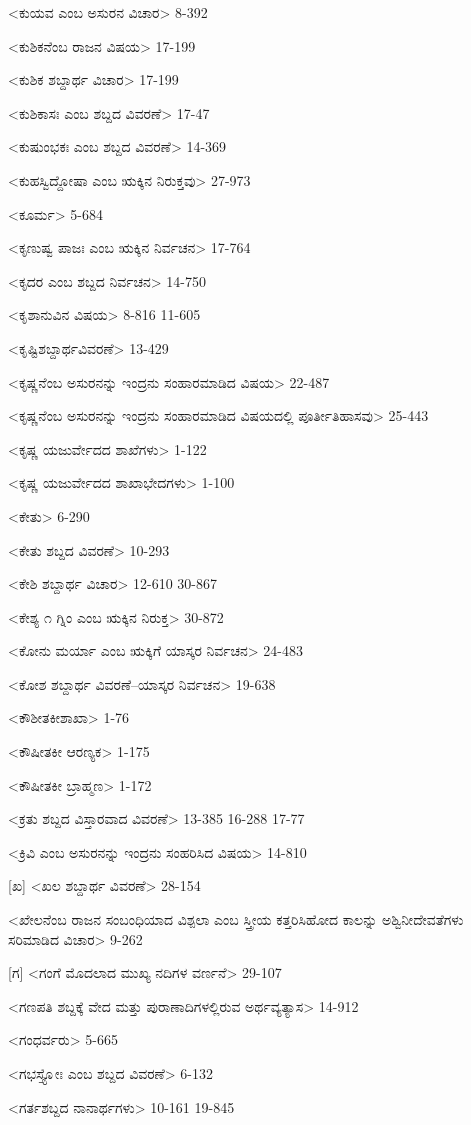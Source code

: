 <ಕುಯವ ಎಂಬ ಅಸುರನ ವಿಚಾರ>
8-392

<ಕುಶಿಕನೆಂಬ ರಾಜನ ವಿಷಯ>
17-199

<ಕುಶಿಕ ಶಬ್ದಾರ್ಥ ವಿಚಾರ>
17-199

<ಕುಶಿಕಾಸಃ ಎಂಬ ಶಬ್ದದ ವಿವರಣೆ>
17-47

<ಕುಷುಂಭಕಃ ಎಂಬ ಶಬ್ದದ ವಿವರಣೆ>
14-369

<ಕುಹಸ್ವಿದ್ದೋಷಾ ಎಂಬ ಋಕ್ಕಿನ ನಿರುಕ್ತವು>
27-973

<ಕೂರ್ಮ>
5-684

<ಕೃಣುಷ್ವ ಪಾಜಃ ಎಂಬ ಋಕ್ಕಿನ ನಿರ್ವಚನ>
17-764

<ಕೃದರ ಎಂಬ ಶಬ್ದದ ನಿರ್ವಚನ>
14-750

<ಕೃಶಾನುವಿನ ವಿಷಯ>
8-816
11-605

<ಕೃಷ್ಟಿಶಬ್ದಾರ್ಥವಿವರಣೆ>
13-429

<ಕೃಷ್ಣನೆಂಬ ಅಸುರನನ್ನು ಇಂದ್ರನು ಸಂಹಾರಮಾಡಿದ ವಿಷಯ>
22-487

<ಕೃಷ್ಣನೆಂಬ ಅಸುರನನ್ನು ಇಂದ್ರನು ಸಂಹಾರಮಾಡಿದ ವಿಷಯದಲ್ಲಿ ಪೂರ್ತೀತಿಹಾಸವು>
25-443

<ಕೃಷ್ಣ ಯಜುರ್ವೇದದ ಶಾಖೆಗಳು>
1-122

<ಕೃಷ್ಣ ಯಜುರ್ವೇದದ ಶಾಖಾಭೇದಗಳು>
1-100

<ಕೇತು>
6-290

<ಕೇತು ಶಬ್ದದ ವಿವರಣೆ>
10-293

<ಕೇಶಿ ಶಬ್ದಾರ್ಥ ವಿಚಾರ>
12-610
30-867

<ಕೇಶ್ಯ ೧ ಗ್ನಿಂ ಎಂಬ ಋಕ್ಕಿನ ನಿರುಕ್ತ>
30-872

<ಕೋನು ಮರ್ಯಾ ಎಂಬ ಋಕ್ಕಿಗೆ ಯಾಸ್ಕರ ನಿರ್ವಚನ>
24-483

<ಕೋಶ ಶಬ್ದಾರ್ಥ ವಿವರಣೆ–ಯಾಸ್ಕರ ನಿರ್ವಚನ>
19-638

<ಕೌಶೀತಕೀಶಾಖಾ>
1-76

<ಕೌಷೀತಕೀ ಆರಣ್ಯಕ>
1-175

<ಕೌಷೀತಕೀ ಬ್ರಾಹ್ಮಣ>
1-172

<ಕ್ರತು ಶಬ್ದದ ವಿಸ್ತಾರವಾದ ವಿವರಣೆ>
13-385 
16-288 
17-77

<ಕ್ರಿವಿ ಎಂಬ ಅಸುರನನ್ನು ಇಂದ್ರನು ಸಂಹರಿಸಿದ ವಿಷಯ>
14-810

[ಖ]
<ಖಲ ಶಬ್ದಾರ್ಥ ವಿವರಣೆ>
28-154


<ಖೇಲನೆಂಬ ರಾಜನ ಸಂಬಂಧಿಯಾದ ವಿಶ್ಪಲಾ ಎಂಬ ಸ್ತ್ರೀಯ ಕತ್ತರಿಸಿಹೋದ ಕಾಲನ್ನು ಅಶ್ವಿನೀದೇವತೆಗಳು ಸರಿಮಾಡಿದ ವಿಚಾರ>
9-262

[ಗ]
<ಗಂಗೆ ಮೊದಲಾದ ಮುಖ್ಯ ನದಿಗಳ ವರ್ಣನೆ>
29-107

<ಗಣಪತಿ ಶಬ್ದಕ್ಕೆ ವೇದ ಮತ್ತು ಪುರಾಣಾದಿಗಳಲ್ಲಿರುವ ಅರ್ಥವ್ಯತ್ಯಾಸ>
14-912

<ಗಂಧರ್ವರು>
5-665

<ಗಭಸ್ತ್ಯೋಃ ಎಂಬ ಶಬ್ದದ ವಿವರಣೆ>
6-132

<ಗರ್ತಶಬ್ದದ ನಾನಾರ್ಥಗಳು>
10-161
19-845

